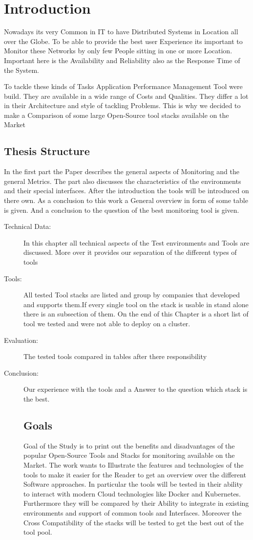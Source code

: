 
\chapter{Introduction}
Nowadays its very Common in IT to have Distributed Systems in Location all over the Globe. To be able to provide the best user Experience its important to Monitor these Networks by only few People sitting in one or more Location. Important here is the Availability and Reliability also as the Response Time of the System. 

To tackle these kinds of Tasks Application Performance Management Tool were build. They are available in a wide range of Costs and Qualities. They differ a lot in their Architecture and style of tackling Problems. This is why we decided to make a Comparison of some large Open-Source tool stacks available on the Market 


\section*{Thesis Structure}
In the first part the Paper describes the general aspects of Monitoring and the general Metrics. The part also discusses the characteristics of the environments and their special interfaces. After the introduction the tools will be introduced on there own. As a conclusion to this work a General overview in form of some table is given. And a conclusion to the question of the best monitoring tool is given. 
\begin{description}
\item[Technical Data:] In this chapter all technical aspects of the Test environments and Tools are discussed. More over it provides our separation of the different types of tools 
\item[Tools:] All tested Tool stacks are listed and group by companies that developed and supports them.If every single tool on the stack is usable in stand alone there is an subsection of them. On the end of this Chapter is a short list of tool we tested and were not able to deploy on a cluster.
\item[Evaluation:]The tested tools compared in tables after there responsibility 
\item[Conclusion:] Our experience with the tools and a Answer to the question which stack is the best.
\section*{Goals}
Goal of the Study is to print out the benefits and disadvantages of the popular Open-Source Tools and Stacks  for monitoring available on the Market. The work wants to Illustrate the features and technologies of the tools to make it easier for the Reader to get an overview over the different Software approaches. In particular the tools will be tested in their ability to interact with modern Cloud technologies like Docker and Kubernetes. Furthermore they will be compared by their Ability to integrate in existing environments and support of common tools and Interfaces. Moreover the Cross Compatibility of the stacks will be tested to get the best out of the tool pool.
\end{description}
